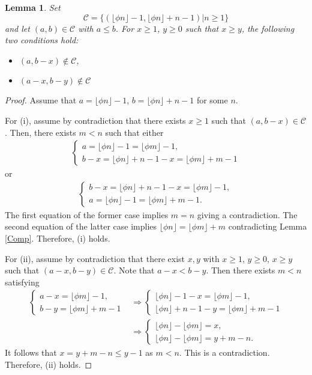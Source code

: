 \documentclass[12pt]{amsart}
\theoremstyle{plain}
\newtheorem{lemma}[proposition]{Lemma}
\theoremstyle{definition}
\theoremstyle{remark}
\begin{document}
\smallskip
\begin{lemma} \label{A-B1}
Set
\[{\mathcal{C}} = \{(\lfloor \phi n \rfloor - 1, \lfloor \phi n \rfloor +n-1) | n \geq 1  \}\]
and let $(a,b) \in {\mathcal{C}}$ with $a \leq b$. For $x \geq 1$, $y \geq 0$ such that $x \geq y$, the following two conditions hold:
\begin{itemize}
\item [(i)] $(a, b-x) \notin {\mathcal{C}}$,
\item [(ii)] $(a-x, b-y) \notin {\mathcal{C}}$
\end{itemize}
\end{lemma}

\begin{proof}
Assume that $a = \lfloor \phi n \rfloor - 1$, $b = \lfloor \phi n \rfloor +n-1$ for some $n$.

For (i), assume by contradiction that there exists $x \geq 1$ such that $(a, b-x) \in {\mathcal{C}}$. Then, there exists $m < n$ such that either
\begin{align*}
\begin{cases}
a = \lfloor \phi n \rfloor - 1 = \lfloor \phi m \rfloor - 1,\\
b-x = \lfloor \phi n \rfloor +n-1 - x = \lfloor \phi m \rfloor +m-1
\end{cases}
\end{align*}
or
\begin{align*}
\begin{cases}
b-x = \lfloor \phi n \rfloor +n - 1-x = \lfloor \phi m \rfloor - 1,\\
a = \lfloor \phi n \rfloor -1 = \lfloor \phi m \rfloor +m-1.
\end{cases}
\end{align*}
The first equation of the former case implies $m = n$ giving a contradiction. The second equation of the latter case implies $\lfloor \phi n \rfloor = \lfloor \phi m \rfloor +m$ contradicting Lemma \ref{Comp}. Therefore, (i) holds.

For (ii), assume by contradiction that there exist $x, y$ with $x \geq 1$, $y \geq 0$, $x \geq y$ such that $(a-x, b-y) \in {\mathcal{C}}$. Note that $a-x < b-y$. Then there exists $m < n$ satisfying
\begin{align*}
\begin{cases}
a-x = \lfloor \phi m \rfloor - 1,\\
b-y = \lfloor \phi m \rfloor +m-1
\end{cases}
&\Rightarrow
\begin{cases}
\lfloor \phi n \rfloor - 1 - x = \lfloor \phi m \rfloor - 1,\\
\lfloor \phi n \rfloor +n-1 - y = \lfloor \phi m \rfloor +m-1
\end{cases}\\
&\Rightarrow
\begin{cases}
\lfloor \phi n \rfloor - \lfloor \phi m \rfloor  = x,\\
\lfloor \phi n \rfloor - \lfloor \phi m \rfloor = y + m - n.
\end{cases}
\end{align*}
It follows that $x = y + m - n \leq y-1$ as $m < n$. This is a contradiction. Therefore, (ii) holds.
\end{proof}
\end{document}
